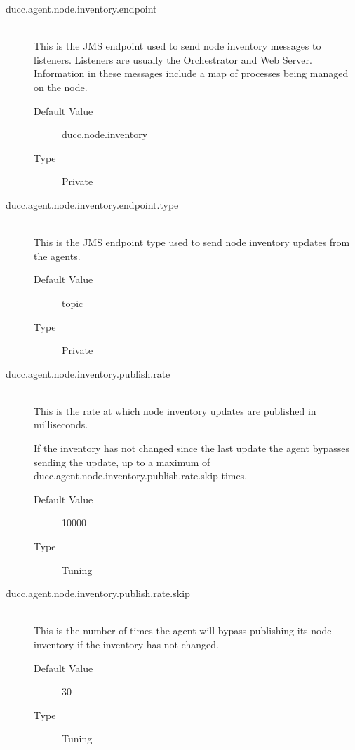 \begin{description}
        \item[ducc.agent.node.inventory.endpoint] \hfill \\
          This is the JMS endpoint used to send node inventory messages to listeners. Listeners are 
          usually the Orchestrator and Web Server. Information in these messages include a map of 
          processes being managed on the node. 
          \begin{description}
            \item[Default Value] ducc.node.inventory 
            \item[Type] Private 
          \end{description}
          
        \item[ducc.agent.node.inventory.endpoint.type] \hfill \\
          This is the JMS endpoint type used to send node inventory updates from the agents. 
          \begin{description}
            \item[Default Value] topic 
            \item[Type] Private 
          \end{description}
          
        \item[ducc.agent.node.inventory.publish.rate] \hfill \\
          This is the rate at which node inventory updates are published in milliseconds. 

          If the inventory has not changed since the last update the agent bypasses sending the 
          update, up to a maximum of ducc.agent.node.inventory.publish.rate.skip times. 
          \begin{description}
            \item[Default Value] 10000 
            \item[Type] Tuning 
          \end{description}
          
        \item[ducc.agent.node.inventory.publish.rate.skip] \hfill \\
          This is the number of times the agent will bypass publishing its node inventory if the 
          inventory has not changed. 
          \begin{description}
            \item[Default Value] 30 
            \item[Type] Tuning 
          \end{description}
          

\end{description}
